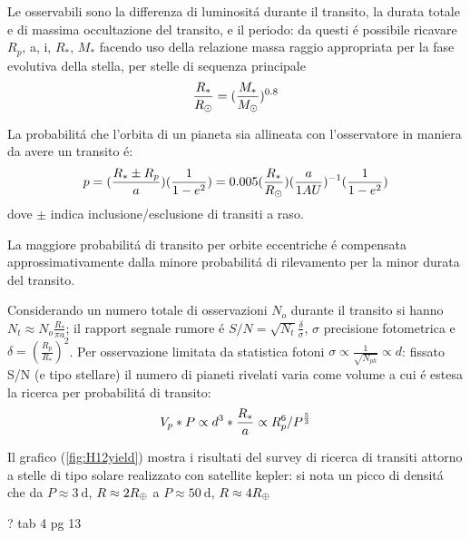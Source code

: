 Le osservabili sono la differenza di luminosit\'a durante il transito, la durata totale e di massima occultazione del transito, e il periodo: da questi \'e possibile ricavare $R_p$, a, i, $R_*$, $M_*$ facendo uso della relazione massa raggio appropriata per la fase evolutiva della stella, per stelle di sequenza principale
\begin{equation}
\frac{R_*}{R_{\odot}{}}=(\frac{M_*}{M_{\odot}{}})^{0.8}
\end{equation}

La probabilit\'a che l'orbita di un pianeta sia allineata con l'osservatore in maniera da avere un transito \'e:
\begin{equation}
p=(\frac{R_*\pm R_p}{a})(\frac{1}{1-e^2})=0.005(\frac{R_*}{R_{\odot}{}})(\frac{a}{1AU})^{-1}(\frac{1}{1-e^2})
\end{equation}
dove $\pm$ indica inclusione/esclusione di transiti a raso.

\begin{workout}
	La maggiore probabilit\'a di transito per orbite eccentriche \'e compensata approssimativamente dalla minore probabilit\'a di rilevamento per la minor durata del transito.
\end{workout}

Considerando un numero totale di osservazioni $N_o$ durante il transito si hanno $N_t\approx N_o\frac{R_*}{\pi a}$; il rapport segnale rumore \'e $S/N=\sqrt{N_t}\frac{\delta}{\sigma}$, $\sigma$ precisione fotometrica e $\delta=(\frac{R_p}{R_*})^2$. Per osservazione limitata da statistica fotoni $\sigma\propto\frac{1}{\sqrt{N_{ph}}}\propto d$: fissato S/N (e tipo stellare) il numero di pianeti rivelati varia come volume a cui \'e estesa la ricerca per probabilit\'a di transito:
\begin{equation}
V_p*P\propto d^3*\frac{R_*}{a}\propto R_p^6/P^{\frac{5}{3}}
\end{equation}

Il grafico (\ref{fig:H12yield}) mostra i risultati del survey di ricerca di transiti attorno a stelle di tipo solare realizzato con satellite kepler: si nota un picco di densit\'a che da $P\approx\SI{3}{\day}$, $R\approx2R_{\oplus}$ a $P\approx\SI{50}{\day}$, $R\approx4R_{\oplus}$


\begin{workout}
?
tab 4 pg 13
\end{workout}

